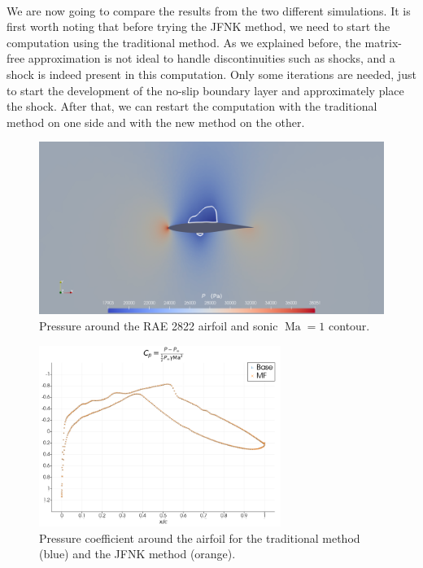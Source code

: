         \paragraph{}
        We are now going to compare the results from the two different simulations.
        It is first worth noting that before trying the JFNK method, we need to start the computation using the traditional method.
        As we explained before, the matrix-free approximation is not ideal to handle discontinuities such as shocks, and a shock is indeed present in this computation.
        Only some iterations are needed, just to start the development of the no-slip boundary layer and approximately place the shock.
        After that, we can restart the computation with the traditional method on one side and with the new method on the other.

        \begin{figure}
          \centering
          \includegraphics[width=\textwidth]{figures/rae_field.png}
          \caption{Pressure around the RAE 2822 airfoil and sonic $\operatorname{Ma} = 1$ contour.}
          \label{fig:rae_field}
        \end{figure}

        \begin{figure}
          \centering
          \includegraphics[width=0.7\textwidth]{figures/rae_cp.png}
          \caption{Pressure coefficient around the airfoil for the traditional method (blue) and the JFNK method (orange).}
          \label{fig:rae_cp}
        \end{figure}

